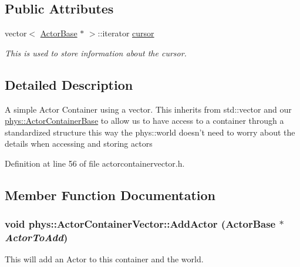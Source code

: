 \subsection*{Public Attributes}
\begin{DoxyCompactItemize}
\item 
vector$<$ \hyperlink{classphys_1_1ActorBase}{ActorBase} $\ast$ $>$::iterator \hyperlink{classphys_1_1ActorContainerVector_a08bdad9b15e265b5d44470f21766b6ed}{cursor}
\begin{DoxyCompactList}\small\item\em This is used to store information about the cursor. \item\end{DoxyCompactList}\end{DoxyCompactItemize}


\subsection{Detailed Description}
A simple Actor Container using a vector. This inherits from std::vector and our \hyperlink{classphys_1_1ActorContainerBase}{phys::ActorContainerBase} to allow us to have access to a container through a standardized structure this way the phys::world doesn't need to worry about the details when accessing and storing actors 

Definition at line 56 of file actorcontainervector.h.



\subsection{Member Function Documentation}
\hypertarget{classphys_1_1ActorContainerVector_a4bc3e38f16caddee021a97739bebaf6e}{
\subsubsection[{AddActor}]{\setlength{\rightskip}{0pt plus 5cm}void phys::ActorContainerVector::AddActor ({\bf ActorBase} $\ast$ {\em ActorToAdd})}}
\label{d3/d64/classphys_1_1ActorContainerVector_a4bc3e38f16caddee021a97739bebaf6e}


This will add an Actor to this container and the world. 

